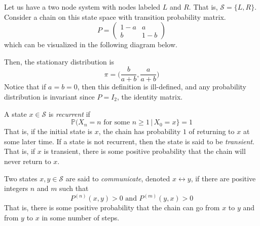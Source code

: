   \begin{example}
    Let us have a two node system with nodes labeled $L$ and $R$. That is, $\mathcal{S} = \{L, R\}$. Consider a chain on this state space with transition probability matrix. 
    \begin{equation}
      P = \begin{pmatrix}
      1-a & a \\ b & 1-b 
      \end{pmatrix}
    \end{equation}
    which can be visualized in the following diagram below.
    \begin{center}
    \end{center}

    Then, the stationary distribution is 
    \begin{equation}
      \pi = \Big( \frac{b}{a+b}, \frac{a}{a+b} \Big)
    \end{equation}
    Notice that if $a = b = 0$, then this definition is ill-defined, and any probability distribution is invariant since $P = I_2$, the identity matrix. 
  \end{example}

  \begin{definition}[Recurrent]
    A state $x \in \mathcal{S}$ is \textit{recurrent} if
    \begin{equation}
      \mathbb{P}(X_n = n \text{ for some } n \geq 1 \, | \, X_0 = x\} = 1
    \end{equation}
    That is, if the initial state is $x$, the chain has probability $1$ of returning to $x$ at some later time. If a state is not recurrent, then the state is said to be \textit{transient}. That is, if $x$ is transient, there is some positive probability that the chain will never return to $x$. 
  \end{definition}

  \begin{definition}[Communication]
    Two states $x, y \in \mathcal{S}$ are said to \textit{communicate}, denoted $x \leftrightarrow y$, if there are positive integers $n$ and $m$ such that 
    \begin{equation}
      P^{(n)} (x, y) > 0 \text{ and } P^{(m)} (y, x) > 0
    \end{equation}
    That is, there is some positive probability that the chain can go from $x$ to $y$ and from $y$ to $x$ in some number of steps. 
  \end{definition}


